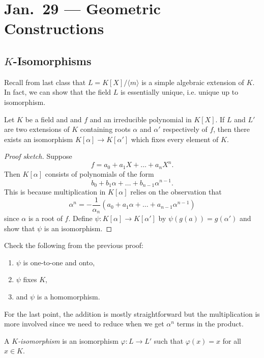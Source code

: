 \chapter{Jan.~29 --- Geometric Constructions}

\section{\texorpdfstring{$K$-Isomorphisms}{K-Isomorphisms}}
Recall from last class that $L = K[X] / \langle m \rangle$
is a simple algebraic extension of $K$. In fact, we
can show that the field $L$ is essentially unique,
i.e. unique up to isomorphism.
\begin{theorem}
  \label{thm:isomorphism-fix}
  Let $K$ be a field and and $f$ and an irreducible
  polynomial in $K[X]$. If $L$ and $L'$ are two extensions
  of $K$ containing roots $\alpha$ and $\alpha'$
  respectively of $f$, then there exists an isomorphism
  $K[\alpha] \to K[\alpha']$ which fixes every element
  of $K$.
\end{theorem}

\begin{proof}[Proof sketch]
  Suppose
  \[
    f = a_0 + a_1 X + \dots + a_n X^n.
  \]
  Then $K[\alpha]$ consists of polynomials of the form
  \[
    b_0 + b_1 \alpha + \dots + b_{n-1} \alpha^{n-1}.
  \]
  This is because multiplication in $K[\alpha]$ relies on
  the observation that
  \[
    \alpha^n = -\frac{1}{\alpha_n} (a_0 + a_1 \alpha + \dots + a_{n-1} \alpha^{n-1})
  \]
  since $\alpha$ is a root of $f$. Define
  $\psi : K[\alpha] \to K[\alpha']$ by
  $\psi(g(a)) = g(\alpha')$ and show that $\psi$
  is an isomorphism.
\end{proof}

\begin{exercise}
  Check the following from the previous proof:
  \begin{enumerate}
    \item $\psi$ is one-to-one and onto,
    \item $\psi$ fixes $K$,
    \item and $\psi$ is a homomorphism.
  \end{enumerate}
  For the last point, the addition is mostly
  straightforward
  but the multiplication is more involved since
  we need to reduce when we get $\alpha^n$ terms
  in the product.
\end{exercise}

\begin{definition}
  A \emph{$K$-isomorphism} is an isomorphism
  $\varphi : L \to L'$
  such that $\varphi(x) = x$ for all $x \in K$.
\end{definition}

